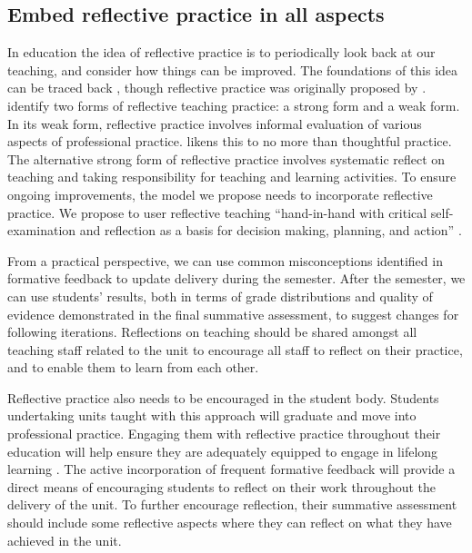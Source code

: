 \subsection{Embed reflective practice in all aspects} %
\label{ssub:embed_reflective_practice_in_all_aspects}

In education the idea of reflective practice is to periodically look back at our teaching, and consider how things can be improved. The foundations of this idea can be traced back \citet{Dewey:1933}, though reflective practice was originally proposed by \citet{Schon:1983}. \citet{Farrell:2007,Farrell:2008} identify two forms of reflective teaching practice: a strong form and a weak form. In its weak form, reflective practice involves informal evaluation of various aspects of professional practice. \citet{Farrell:2008} likens this to no more than thoughtful practice. The alternative strong form of reflective practice involves systematic reflect on teaching and taking responsibility for teaching and learning activities. To ensure ongoing improvements, the model we propose needs to incorporate reflective practice. We propose to user reflective teaching ``hand-in-hand with critical self-examination and reflection as a basis for decision making, planning, and action'' \cite{Richards:1994}. %

From a practical perspective, we can use common misconceptions identified in formative feedback to update delivery during the semester. After the semester, we can use students' results, both in terms of grade distributions and quality of evidence demonstrated in the final summative assessment, to suggest changes for following iterations. Reflections on teaching should be shared amongst all teaching staff related to the unit to encourage all staff to reflect on their practice, and to enable them to learn from each other.

Reflective practice also needs to be encouraged in the student body. Students undertaking units taught with this approach will graduate and move into professional practice. Engaging them with reflective practice throughout their education will help ensure they are adequately equipped to engage in lifelong learning \cite{Field:2006}. The active incorporation of frequent formative feedback will provide a direct means of encouraging students to reflect on their work throughout the delivery of the unit. To further encourage reflection, their summative assessment should include some reflective aspects where they can reflect on what they have achieved in the unit. 

